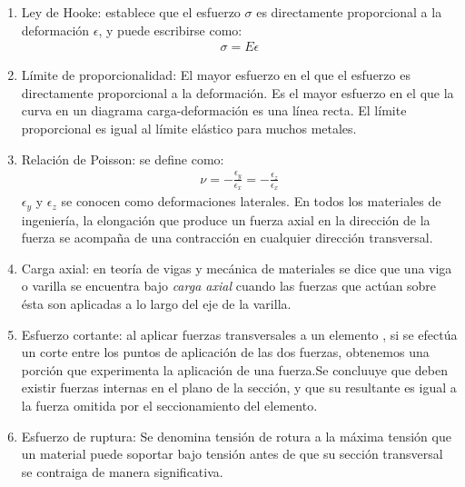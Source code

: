 \documentclass[12pt, letterpaper]{article}
\begin{document}
\begin{enumerate}
    \item Ley de Hooke: establece que el esfuerzo $\sigma$ es directamente proporcional a la deformación $\epsilon$, y puede escribirse como\autocite{MM}:
    \begin{align}
        \sigma = E\epsilon
    \end{align}
    
    \item Límite de proporcionalidad: El mayor esfuerzo en el que el esfuerzo es directamente proporcional a la deformación. Es el mayor esfuerzo en el que la curva en un diagrama carga-deformación es una línea recta. El límite proporcional es igual al límite elástico para muchos metales.\autocite{Ins} 
    
    \item Relación de Poisson: se define como:
    \begin{align}
        \nu = -\frac{\epsilon_y}{\epsilon_x} = -\frac{\epsilon_z}{\epsilon_x}
    \end{align}
    $\epsilon_y$ y $\epsilon_z$ se conocen como deformaciones laterales. En todos los materiales de ingeniería, la elongación que produce un fuerza axial en la dirección de la fuerza se acompaña de una contracción en cualquier dirección transversal.\autocite{MM}
    
    \item Carga axial: en teoría de vigas y mecánica de materiales se dice que una viga o varilla se encuentra bajo \emph{carga axial} cuando las fuerzas que actúan sobre ésta son aplicadas a lo largo del eje de la varilla.\autocite{MM}
    
    \item Esfuerzo cortante: al aplicar fuerzas transversales a un elemento , si se efectúa un corte entre los puntos de aplicación de las dos fuerzas, obtenemos una porción que experimenta la aplicación de una fuerza.Se concluuye que deben existir fuerzas internas en el plano de la sección, y que su resultante es igual a la fuerza omitida por el seccionamiento del elemento.\autocite{MM}
    
    \item Esfuerzo de ruptura: Se denomina tensión de rotura a la máxima tensión que un material puede soportar bajo tensión antes de que su sección transversal se contraiga de manera significativa.
\end{enumerate}
\renewcommand\refname{Referencias}
\printbibliography
\end{document}
